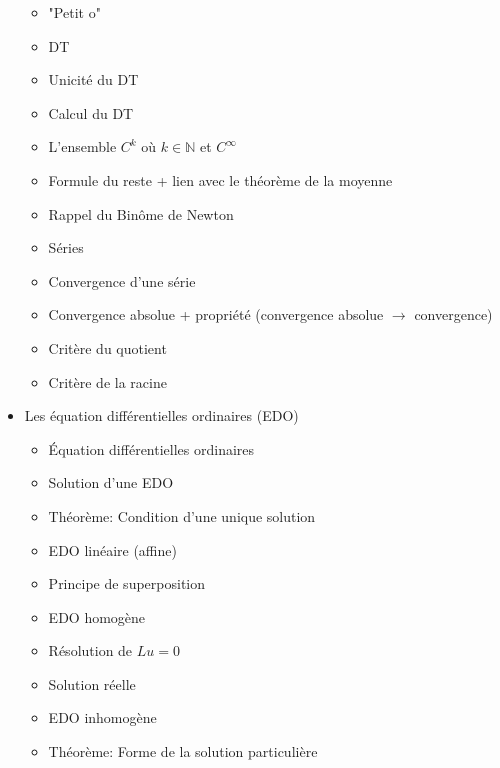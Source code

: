 \documentclass[a4paper,11pt]{report}
\begin{document}
\begin{itemize}
	\begin{itemize}
		\item "Petit o"
		\item DT
		\item Unicité du DT
		\item Calcul du DT
		\item L'ensemble $C^k$ où $k\in\mathbb{N}$ et $C^\infty$
		\item Formule du reste + lien avec le théorème de la moyenne
		\item Rappel du Binôme de Newton
		\item Séries
		\item Convergence d'une série
		\item Convergence absolue + propriété (convergence absolue $\rightarrow$ convergence)
		\item Critère du quotient
		\item Critère de la racine
	\end{itemize}
	\item Les équation différentielles ordinaires (EDO)
	\begin{itemize}
		\item Équation différentielles ordinaires
		\item Solution d'une EDO
		\item Théorème: Condition d'une unique solution
		\item EDO linéaire (affine)
		\item Principe de superposition
		\item EDO homogène
		\item Résolution de $Lu=0$
		\item Solution réelle
		\item EDO inhomogène
		\item Théorème: Forme de la solution particulière
	\end{itemize}
\end{itemize}
\end{document}
